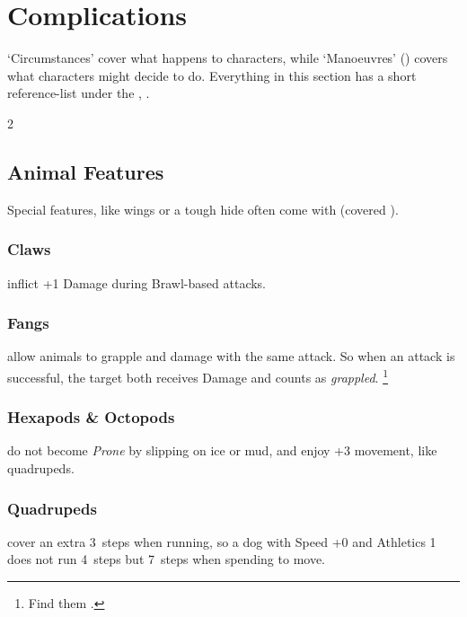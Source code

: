 \projectilesChart

\bigbreak

\section{Complications}

`Circumstances' cover what happens to characters, while `Manoeuvres' () covers what characters might decide to do.
Everything in this section has a short reference-list under the , .

\begin{multicols}{2}

\subsection{Animal Features}
\label{creatureAbilities}%
%

Special features, like wings or a tough hide often come with  (covered ).

\subsubsection{Claws}
\label{claws}
inflict +1 Damage during Brawl-based attacks.

\subsubsection{Fangs}
\label{teeth}
\label{fangs}
allow animals to grapple and damage with the same attack.
So when an attack is successful, the target both receives Damage and counts as \textit{grappled}.%
\footnote{Find them .}

\subsubsection{Hexapods \& Octopods}
do not become \textit{Prone} by slipping on ice or mud, and enjoy +3 movement, like quadrupeds.

\subsubsection{Quadrupeds}
cover an extra 3~\glspl{step} when \gls{running}, so a dog with Speed +0 and Athletics 1 does not run 4~\glspl{step} but 7~\glspl{step} when spending  to move.


\end{multicols}
